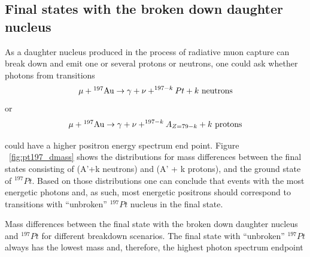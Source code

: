 \documentclass[12pt]{article}
\newcommand {\Au}[1]     {\mbox{$\rm ^{#1}Au$}}                 %
\begin{document}
\subsection{Final states with the broken down  daughter nucleus}

As a daughter nucleus produced in the process of radiative muon capture can
break down and emit one or several protons or neutrons, one could ask whether
photons from transitions
$$
\mu + \Au{197} \rightarrow \gamma + \nu + ^{197-k}Pt + k \rm ~neutrons
$$
or 
$$
\mu + \Au{197} \rightarrow \gamma + \nu + ^{197-k}A_{Z=79-k} + k \rm ~protons
$$

could have a higher positron energy spectrum end point.
Figure ~\ref{fig:pt197_dmass} shows the distributions for mass differences
between the final states consisting of (A'+k neutrons) and (A' + k protons),
and the ground state of $^{197}Pt$. Based on those distributions one can conclude
that events with the most energetic photons and, as such, most energetic 
positrons should correspond to transitions with ``unbroken'' $^{197}Pt$ nucleus
in the final state.

\vspace{0.1in}
 {
  \label{fig:pt197_dmass}
  Mass differences between the final state with the broken down daughter nucleus
  and $^{197} Pt$ for different breakdown scenarios.
  The final state with ``unbroken'' $^{197} Pt$ always has the lowest mass and,
  therefore, the highest photon spectrum endpoint
}
\vspace{0.1in}
\end{document}
